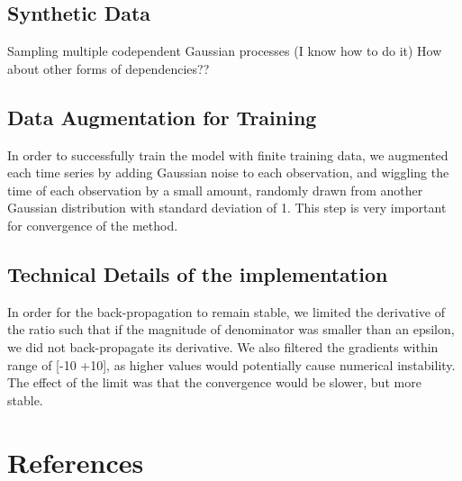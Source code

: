 \documentclass{article} %
\begin{document}
\subsection{Synthetic Data}
Sampling multiple codependent Gaussian processes (I know how to do it)
How about other forms of dependencies??

\subsection{Data Augmentation for Training}
In order to successfully train the model with finite training data, we augmented each time series by adding Gaussian noise to each observation, and wiggling the time of each observation by a small amount, randomly drawn from another Gaussian distribution with standard deviation of 1. This step is very important for convergence of the method. 

\subsection{Technical Details of the implementation}
In order for the back-propagation to remain stable, we limited the derivative of the ratio such that if the magnitude of denominator was smaller than an epsilon, we did not back-propagate its derivative. We also filtered the gradients within range of [-10 +10], as higher values would potentially cause numerical instability. The effect of the limit was that the convergence would be slower, but more stable.


\section{References}
\end{document}
